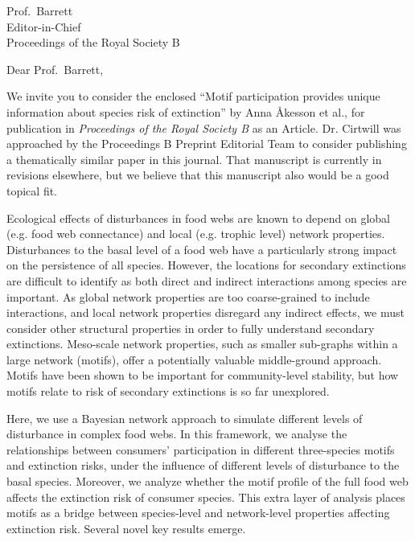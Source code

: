 \documentclass[10.5pt]{letter}
\date{October 21, 2021}
\begin{document}
\begin{letter}{
\vspace{-2.5cm}

Prof.~Barrett\\
Editor-in-Chief\\
Proceedings of the Royal Society B} %


\opening{Dear Prof.~Barrett,}

We invite you to consider the enclosed ``Motif participation provides unique information about species risk of extinction'' by Anna {\AA}kesson et al., for publication in \emph{Proceedings of the Royal Society B} as an Article. Dr. Cirtwill was approached by the Proceedings B Preprint Editorial Team to consider publishing a thematically similar paper in this journal. That manuscript is currently in revisions elsewhere, but we believe that this manuscript also would be a good topical fit. 

Ecological effects of disturbances in food webs are known to depend on global (e.g. food web connectance) and local (e.g. trophic level) network properties. Disturbances to the basal level of a food web have a particularly strong impact on the persistence of all species. 
However, the locations for secondary extinctions are difficult to identify as both direct and indirect interactions among species are important. As global network properties are too coarse-grained to include interactions, and local network properties disregard any indirect effects, we must consider other structural properties in order to fully understand secondary extinctions. Meso-scale network properties, such as smaller sub-graphs within a large network (motifs), offer a potentially valuable middle-ground approach. Motifs have been shown to be important for community-level stability, but how motifs relate to risk of secondary extinctions is so far unexplored.   

Here, we use a Bayesian network approach to simulate different levels of disturbance in complex food webs.
In this framework, we analyse the relationships between consumers' participation in different three-species motifs and extinction risks, under the influence of different levels of disturbance to the basal species. 
Moreover, we analyze whether the motif profile of the full food web affects the extinction risk of consumer species.
This extra layer of analysis places motifs as a bridge between species-level and network-level properties affecting extinction risk.
Several novel key results emerge.


\end{letter}
\end{document}

